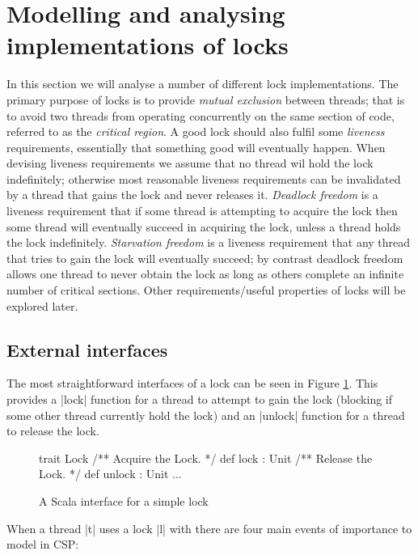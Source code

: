 \section{Modelling and analysing implementations of locks}
\label{sec:locks}

\inlineScala

In this section we will analyse a number of different lock implementations. 
The primary purpose of locks is to provide \emph{mutual exclusion} between threads; that is to avoid two threads from operating concurrently on the same section of code, referred to as the \emph{critical region}. A good lock should also fulfil some \emph{liveness} requirements, essentially that something good will eventually happen. When devising liveness requirements we assume that no thread wil hold the lock indefinitely; otherwise most reasonable liveness requirements can be invalidated by a thread that gains the lock and never releases it. \emph{Deadlock freedom} is a liveness requirement that if some thread is attempting to acquire the lock then some thread will eventually succeed in acquiring the lock, unless a thread holds the lock indefinitely. \emph{Starvation freedom} is a liveness requirement that any thread that tries to gain the lock will eventually succeed; by contrast deadlock freedom allows one thread to never obtain the lock as long as others complete an infinite number of critical sections. Other requirements/useful properties of locks will be explored later.

\subsection{External interfaces}

The most straightforward interfaces of a lock can be seen in Figure \ref{code:LockInterface}. This provides a |lock| function for a thread to attempt to gain the lock (blocking if some other thread currently hold the lock) and an |unlock| function for a thread to release the lock. 

\begin{figure}
\begin{scala}
  trait Lock{
    /** Acquire the Lock. */
    def lock : Unit
    /** Release the Lock. */
    def unlock : Unit 
    ...
  }
\end{scala}
\caption{A Scala interface for a simple lock}
\label{code:LockInterface}
\end{figure}

When a thread |t| uses a lock |l| with there are four main events of importance to model in CSP:

